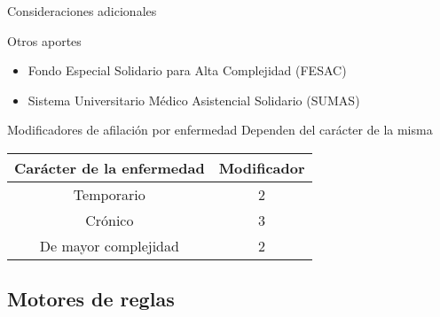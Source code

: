 \documentclass[10pt]{beamer}
\begin{document}
\begin{frame}{Consideraciones adicionales}
    \begin{block}{Otros aportes}
        \begin{itemize}
            \item Fondo Especial Solidario para Alta Complejidad (FESAC)
            \item Sistema Universitario Médico Asistencial Solidario (SUMAS)
        \end{itemize}
    \end{block}
    \begin{block}{Modificadores de afilación por enfermedad}
        Dependen del carácter de la misma
        \begin{table}
            \centering
        \begin{tabular}{|c|c|}
            \hline
            Carácter de la enfermedad & Modificador \\ \hline
            Temporario & 2 \\ \hline
            Crónico & 3 \\ \hline
            De mayor complejidad & 2 \\ \hline
        \end{tabular}
        \end{table}
    \end{block}
\end{frame}
\begin{comment}
Además del monto resultante de la aplicación de las fórmulas presentadas, dependiente de la categoría y subcategoría del afiliado, existen algunos aportes adicionales. Algunos de estos aportes son obligatorios, y otros opcionales.
Estos incluyen (aportes en la slide)

Por otra parte, para los voluntarios jubilados, en el caso de que estos ingresen a DOSPU con condiciones preexistentes, se aplica un modificador según la naturaleza de la condición (cuadro de la slide).
\end{comment}

\subsection{Motores de reglas}
\end{document}

